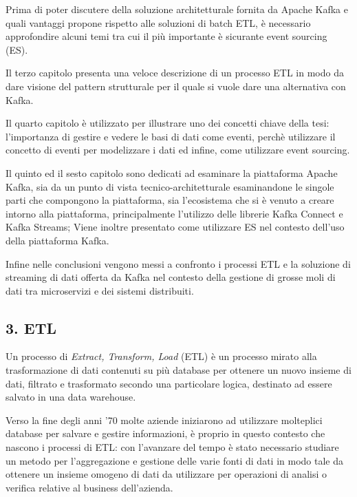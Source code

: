 \documentclass[]{article}
\begin{document}
Prima di poter discutere della soluzione architetturale fornita da
Apache Kafka e quali vantaggi propone rispetto alle soluzioni di batch
ETL, è necessario approfondire alcuni temi tra cui il più importante è
sicurante event sourcing (ES).

Il terzo capitolo presenta una veloce descrizione di un processo ETL in
modo da dare visione del pattern strutturale per il quale si vuole dare
una alternativa con Kafka.

Il quarto capitolo è utilizzato per illustrare uno dei concetti chiave
della tesi: l'importanza di gestire e vedere le basi di dati come
eventi, perchè utilizzare il concetto di eventi per modelizzare i dati
ed infine, come utilizzare event sourcing.

Il quinto ed il sesto capitolo sono dedicati ad esaminare la piattaforma
Apache Kafka, sia da un punto di vista tecnico-architetturale
esaminandone le singole parti che compongono la piattaforma, sia
l'ecosistema che si è venuto a creare intorno alla piattaforma,
principalmente l'utilizzo delle librerie Kafka Connect e Kafka Streams;
Viene inoltre presentato come utilizzare ES nel contesto dell'uso della
piattaforma Kafka.

Infine nelle conclusioni vengono messi a confronto i processi ETL e la
soluzione di streaming di dati offerta da Kafka nel contesto della
gestione di grosse moli di dati tra microservizi e dei sistemi
distribuiti.

\newpage

\hypertarget{etl}{\subsection{3. ETL}\label{etl}}

Un processo di \emph{Extract, Transform, Load} (ETL) è un processo
mirato alla trasformazione di dati contenuti su più database per
ottenere un nuovo insieme di dati, filtrato e trasformato secondo una
particolare logica, destinato ad essere salvato in una data warehouse.

Verso la fine degli anni '70 molte aziende iniziarono ad utilizzare
molteplici database per salvare e gestire informazioni, è proprio in
questo contesto che nascono i processi di ETL: con l'avanzare del tempo
è stato necessario studiare un metodo per l'aggregazione e gestione
delle varie fonti di dati in modo tale da ottenere un insieme omogeno di
dati da utilizzare per operazioni di analisi o verifica relative al
business dell'azienda.
\end{document}
